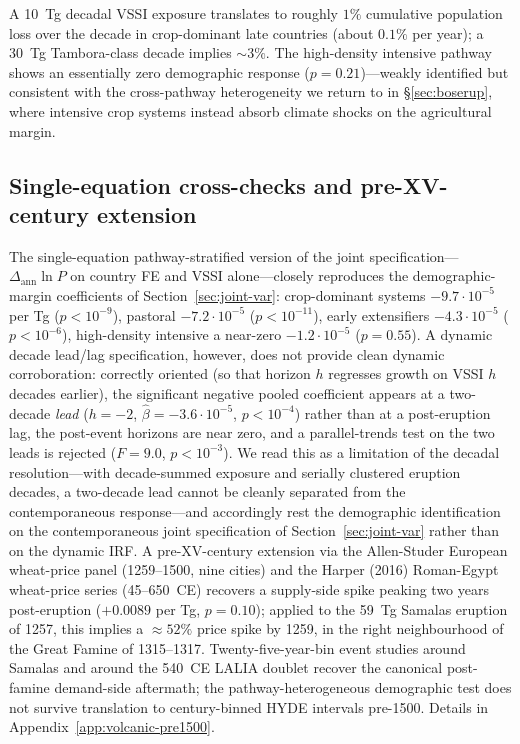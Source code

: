 \documentclass[11pt,letterpaper]{article}
\begin{document}
A 10~Tg decadal VSSI exposure translates to roughly $1\%$ cumulative population loss over the decade in crop-dominant late countries (about $0.1\%$ per year); a 30~Tg Tambora-class decade implies $\sim 3\%$. The high-density intensive pathway shows an essentially zero demographic response ($p=0.21$)---weakly identified but consistent with the cross-pathway heterogeneity we return to in §\ref{sec:boserup}, where intensive crop systems instead absorb climate shocks on the agricultural margin.

\subsection{Single-equation cross-checks and pre-XV-century extension}
\label{sec:volcanic}

The single-equation pathway-stratified version of the joint specification---$\Delta_{\text{ann}} \ln P$ on country FE and VSSI alone---closely reproduces the demographic-margin coefficients of Section~\ref{sec:joint-var}: crop-dominant systems $-9.7\!\cdot\!10^{-5}$ per Tg ($p<10^{-9}$), pastoral $-7.2\!\cdot\!10^{-5}$ ($p<10^{-11}$), early extensifiers $-4.3\!\cdot\!10^{-5}$ ($p<10^{-6}$), high-density intensive a near-zero $-1.2\!\cdot\!10^{-5}$ ($p=0.55$). A dynamic decade lead/lag specification, however, does not provide clean dynamic corroboration: correctly oriented (so that horizon $h$ regresses growth on VSSI $h$ decades earlier), the significant negative pooled coefficient appears at a two-decade \emph{lead} ($h=-2$, $\hat\beta=-3.6\!\cdot\!10^{-5}$, $p<10^{-4}$) rather than at a post-eruption lag, the post-event horizons are near zero, and a parallel-trends test on the two leads is rejected ($F=9.0$, $p<10^{-3}$). We read this as a limitation of the decadal resolution---with decade-summed exposure and serially clustered eruption decades, a two-decade lead cannot be cleanly separated from the contemporaneous response---and accordingly rest the demographic identification on the contemporaneous joint specification of Section~\ref{sec:joint-var} rather than on the dynamic IRF. A pre-XV-century extension via the Allen-Studer European wheat-price panel (1259--1500, nine cities) and the Harper (2016) Roman-Egypt wheat-price series (45--650~CE) recovers a supply-side spike peaking two years post-eruption ($+0.0089$ per Tg, $p=0.10$); applied to the 59~Tg Samalas eruption of 1257, this implies a $\approx 52\%$ price spike by 1259, in the right neighbourhood of the Great Famine of 1315--1317. Twenty-five-year-bin event studies around Samalas and around the 540~CE LALIA doublet recover the canonical post-famine demand-side aftermath; the pathway-heterogeneous demographic test does not survive translation to century-binned HYDE intervals pre-1500. Details in Appendix~\ref{app:volcanic-pre1500}.
\end{document}
